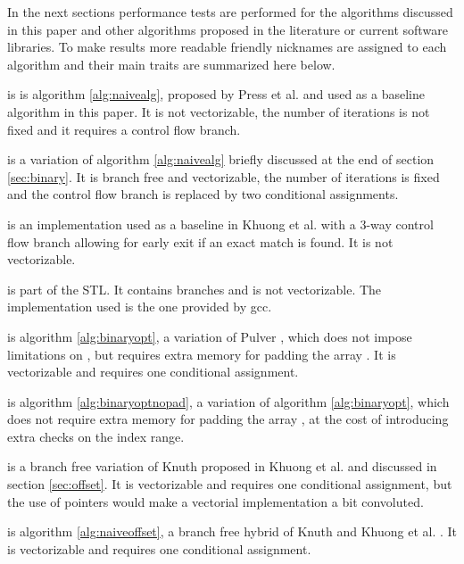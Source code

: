 \documentclass[preprint,1p,times]{elsarticle}
\newcounter{subsubsubsection}[subsubsection]
\begin{document}
In the next sections performance tests are performed for the algorithms discussed in this paper and other algorithms proposed in the literature or current software libraries. To make results more readable friendly nicknames are assigned to each algorithm and their main traits are summarized here below.
	\begin{myitemize}
		\item \textit{\ClassicName} is is algorithm \ref{alg:naivealg}, proposed by Press et al. \cite{NRC++} and used as a baseline algorithm in this paper. It is not vectorizable, the number of iterations is not fixed and it requires a control flow branch.
		\item \textit{\ClassicModName} is a variation of algorithm \ref{alg:naivealg} briefly discussed at the end of section \ref{sec:binary}. It is branch free and vectorizable, the number of iterations is fixed and the control flow branch is replaced by two conditional assignments.
		\item \textit{\MorinBranchyName} is an implementation used as a baseline in Khuong et al. \cite{Morin2015} with a 3-way  control flow branch allowing for early exit if an exact match is found. It is not vectorizable.
		\item \textit{\LowerBoundName} is part of the STL. It contains branches and is not vectorizable. The implementation used is the one provided by gcc. 
		\item \textit{\BitSetName} is algorithm \ref{alg:binaryopt}, a variation of Pulver \cite{Pulver2011}, which does not impose limitations on , but requires extra memory for padding the array . It is vectorizable and requires one conditional assignment. 
		\item \textit{\BitSetNoPadName} is algorithm \ref{alg:binaryoptnopad}, a variation of algorithm \ref{alg:binaryopt}, which does not require extra memory for padding the array , at the cost of introducing extra checks on the index range.		
		\item \textit{\MorinOffsetName} is a branch free variation of Knuth \cite{Knuth1997} proposed in Khuong et al. \cite{Morin2015} and discussed in section \ref{sec:offset}. It is vectorizable and requires one conditional assignment, but the use of pointers would make a vectorial implementation a bit convoluted.
		\item \textit{\ClassicOffsetName} is algorithm \ref{alg:naiveoffset}, a branch free hybrid of Knuth \cite{Knuth1997} and Khuong et al. \cite{Morin2015}. It is vectorizable and requires one conditional assignment.

\end{myitemize}
\end{document}
